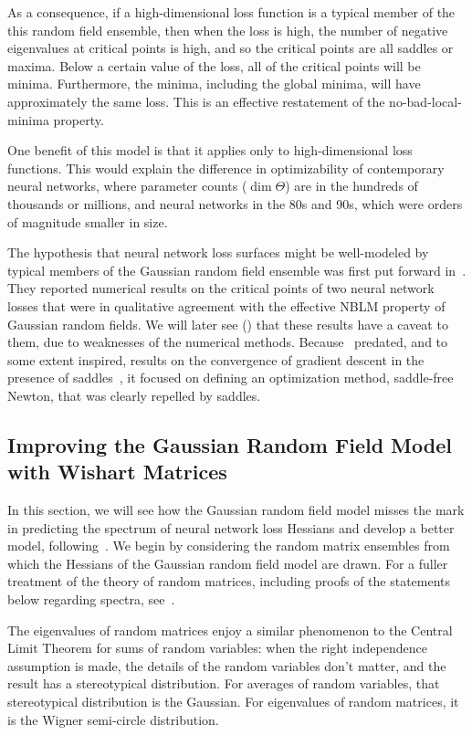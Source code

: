 \documentclass[../../thesis.tex]{subfiles}
\begin{document}
As a consequence, if a high-dimensional loss function is a typical member of the
this random field ensemble, then
when the loss is high,
the number of negative eigenvalues at critical points is high,
and so the critical points are all saddles or maxima.
Below a certain value of the loss,
all of the critical points will be minima.
Furthermore,
the minima, including the global minima,
will have approximately the same loss.
This is an effective restatement
of the no-bad-local-minima property.

One benefit of this model is that it
applies only to high-dimensional loss functions.
This would explain the difference in optimizability
of contemporary neural networks,
where parameter counts ($\dim \Theta$)
are in the hundreds of thousands or millions,
and neural networks in the 80s and 90s,
which were orders of magnitude smaller in size.

The hypothesis that neural network loss surfaces
might be well-modeled by typical members
of the Gaussian random field ensemble
was first put forward in~\cite{dauphin2014}.
They reported numerical results on the critical points
of two neural network losses that were in qualitative
agreement with the effective NBLM property
of Gaussian random fields.
We will later see ()
that these results have a caveat to them,
due to weaknesses of the numerical methods.
Because~\cite{dauphin2014} predated,
and to some extent inspired,
results on the convergence of gradient descent
in the presence of saddles~\cite{lee2016,jin2018a},
it focused on defining an optimization method,
saddle-free Newton,
that was clearly repelled by saddles.

\subsection{Improving the Gaussian Random Field Model with Wishart Matrices}

In this section, we will see
how the Gaussian random field model misses the mark
in predicting the spectrum of neural network loss Hessians
and develop a better model, following~\cite{pennington2017}.
We begin by considering the random matrix ensembles
from which the Hessians of the Gaussian random field model
are drawn.
For a fuller treatment of the theory of random matrices,
including proofs of the statements below regarding spectra,
see~\cite{feier2012,tao2012}.

The eigenvalues of random matrices enjoy a similar phenomenon
to the Central Limit Theorem for sums of random variables:
when the right independence assumption is made,
the details of the random variables don't matter,
and the result has a stereotypical distribution.
For averages of random variables,
that stereotypical distribution is the Gaussian.
For eigenvalues of random matrices,
it is the Wigner semi-circle distribution.
\end{document}
